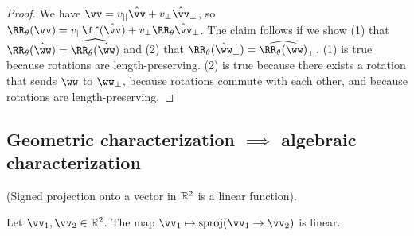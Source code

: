 \begin{proof}
    We have $\vv = v_{||} \hvv + v_\perp \hvv_\perp$, so $\RR_\theta(\vv) = v_{||} \ff(\hvv) + v_\perp \RR_\theta \hvv_\perp$. The claim follows if we show (1) that $\RR_\theta(\hww) = \widehat{\RR_\theta(\hww)}$ and (2) that $\RR_\theta(\hww_\perp) = \widehat{\RR_\theta(\ww)}_\perp$. (1) is true because rotations are length-preserving. (2) is true because there exists a rotation that sends $\ww$ to $\ww_\perp$, because rotations commute with each other, and because rotations are length-preserving.
\end{proof}

\subsection*{Geometric characterization $\implies$ algebraic characterization}

\begin{lemma}
    (Signed projection onto a vector in $\mathbb{R}^2$ is a linear function).
    
    Let $\vv_1, \vv_2 \in \R^2$. The map $\vv_1 \mapsto \sproj(\vv_1 \rightarrow \vv_2)$ is linear.
\end{lemma}

